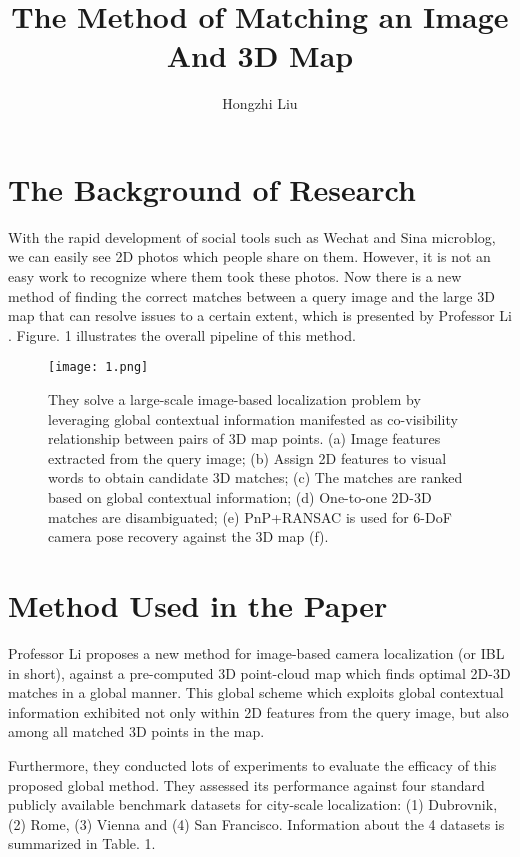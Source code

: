 \documentclass{article}
\author{Hongzhi Liu}
\title{The Method of Matching an Image And 3D Map}
\begin{document}
	\maketitle
	\par
	\section{The Background of Research}
    With the rapid development of social tools such as Wechat and Sina microblog, we can easily see 2D photos which people share on them. However, it is not an easy work to recognize where them took these photos. Now there is a new method of finding the correct matches between a query image and the large 3D map that can resolve issues to a certain extent, which is presented by Professor Li \cite{Liu2017Efficient}. Figure. 1 illustrates the overall pipeline of this method.
	
	\begin{figure}[ht]
		\centering
		\texttt{[image: 1.png]}
		\caption{They solve a large-scale image-based localization problem by leveraging global contextual information manifested as co-visibility relationship between pairs of 3D map points. (a) Image features extracted from the query image; (b) Assign 2D features to visual words to obtain candidate 3D matches; (c) The matches are ranked based on global contextual information; (d) One-to-one 2D-3D matches are disambiguated; (e) PnP+RANSAC is used for 6-DoF camera pose recovery against the 3D map (f).}
	\end{figure}

	
	\section{Method Used in the Paper}
	
    Professor Li proposes a new method for image-based camera localization (or IBL in short), against a pre-computed 3D point-cloud map which finds optimal 2D-3D matches in a global manner. This global scheme which exploits global contextual information exhibited not only within 2D features from the query image, but also among all matched 3D points in the map.

    Furthermore, they conducted lots of experiments to evaluate the efficacy of this proposed global method. They assessed its performance against four standard publicly available benchmark datasets for city-scale localization: (1) Dubrovnik, (2) Rome, (3) Vienna and (4) San Francisco. Information about the 4 datasets is summarized in Table. 1.
\end{document}
